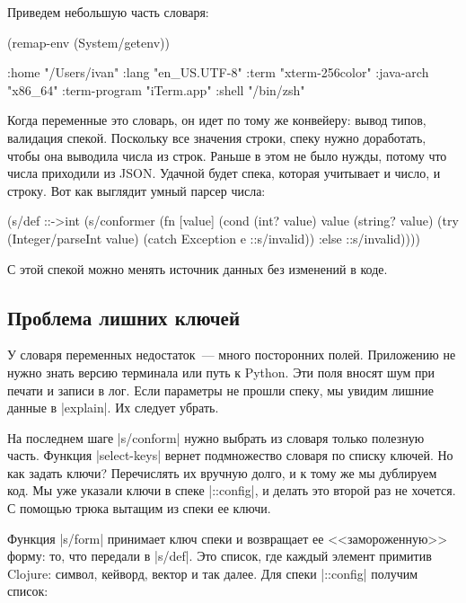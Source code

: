 \noindent
Приведем небольшую часть словаря:

\begin{english}
  \begin{clojure}
(remap-env (System/getenv))

{:home "/Users/ivan"
 :lang "en_US.UTF-8"
 :term "xterm-256color"
 :java-arch "x86_64"
 :term-program "iTerm.app"
 :shell "/bin/zsh"}
  \end{clojure}
\end{english}

Когда переменные это словарь, он идет по тому же конвейеру: вывод типов,
валидация спекой. Поскольку все значения строки, спеку нужно доработать, чтобы
она выводила числа из строк. Раньше в этом не было нужды, потому что числа
приходили из JSON. Удачной будет спека, которая учитывает и число, и строку. Вот
как выглядит умный парсер числа:

\begin{english}
  \begin{clojure}
(s/def ::->int
  (s/conformer
   (fn [value]
     (cond
       (int? value) value
       (string? value)
       (try (Integer/parseInt value)
            (catch Exception e
              ::s/invalid))
       :else ::s/invalid))))
  \end{clojure}
\end{english}

С этой спекой можно менять источник данных без изменений в коде.

\subsection{Проблема лишних ключей}

У словаря переменных недостаток~--- много посторонних полей. Приложению не нужно
знать версию терминала или путь к Python. Эти поля вносят шум при печати и
записи в лог. Если параметры не прошли спеку, мы увидим лишние данные в
\spverb|explain|. Их следует убрать.

На последнем шаге \spverb|s/conform| нужно выбрать из словаря только полезную
часть. Функция \spverb|select-keys| вернет подмножество словаря по списку
ключей. Но как задать ключи? Перечислять их вручную долго, и к тому же мы
дублируем код. Мы уже указали ключи в спеке \spverb|::config|, и делать это
второй раз не хочется. С помощью трюка вытащим из спеки ее ключи.

Функция \spverb|s/form| принимает ключ спеки и возвращает ее <<замороженную>>
форму: то, что передали в \spverb|s/def|. Это список, где каждый элемент
примитив Clojure: символ, кейворд, вектор и так далее. Для спеки
\spverb|::config| получим список:

